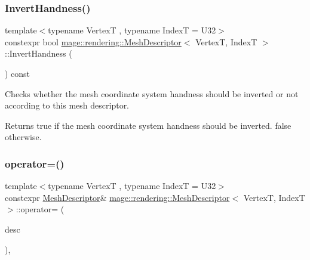\subsubsection{\texorpdfstring{Invert\+Handness()}{InvertHandness()}}
{\footnotesize\ttfamily template$<$typename VertexT , typename IndexT  = U32$>$ \\
constexpr bool \mbox{\hyperlink{classmage_1_1rendering_1_1_mesh_descriptor}{mage\+::rendering\+::\+Mesh\+Descriptor}}$<$ VertexT, IndexT $>$\+::Invert\+Handness (\begin{DoxyParamCaption}{ }\end{DoxyParamCaption}) const\hspace{0.3cm}{\ttfamily [noexcept]}}

Checks whether the mesh coordinate system handness should be inverted or not according to this mesh descriptor.

\begin{DoxyReturn}{Returns}
{\ttfamily true} if the mesh coordinate system handness should be inverted. {\ttfamily false} otherwise. 
\end{DoxyReturn}
\mbox{\label{classmage_1_1rendering_1_1_mesh_descriptor_a9db3890980a6e0c7ccc315067bc55853}} 
\subsubsection{\texorpdfstring{operator=()}{operator=()}\hspace{0.1cm}{\footnotesize\ttfamily [1/2]}}
{\footnotesize\ttfamily template$<$typename VertexT , typename IndexT  = U32$>$ \\
constexpr \mbox{\hyperlink{classmage_1_1rendering_1_1_mesh_descriptor}{Mesh\+Descriptor}}\& \mbox{\hyperlink{classmage_1_1rendering_1_1_mesh_descriptor}{mage\+::rendering\+::\+Mesh\+Descriptor}}$<$ VertexT, IndexT $>$\+::operator= (\begin{DoxyParamCaption}\item[{const \mbox{\hyperlink{classmage_1_1rendering_1_1_mesh_descriptor}{Mesh\+Descriptor}}$<$ VertexT, IndexT $>$ \&}]{desc }\end{DoxyParamCaption})\hspace{0.3cm}{\ttfamily [default]}, {\ttfamily [noexcept]}}


